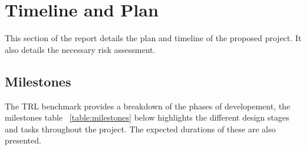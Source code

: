 
\chapter[Timeline and Plan]{Timeline and Plan}
\label{Chap:label}	%
\pagestyle{headings}



This section of the report details the plan and timeline of the proposed project. It also details the necessary risk assessment.


\section{Milestones}
\label{Sec:label}	%

The TRL benchmark provides a breakdown of the phases of developement, the milestones table ~\ref{table:milestones} below highlights the different design 
stages and tasks throughout the project. The expected durations of these are also presented.
  

